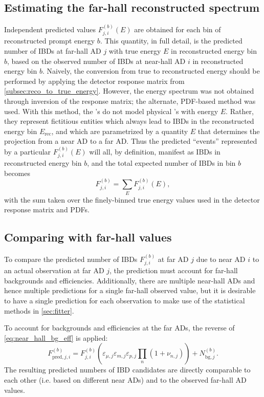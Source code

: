 \subsection{Estimating the far-hall reconstructed spectrum}
\label{subsec:true_to_reco_farhall}

Independent predicted values $F_{j,i}^{(b)}(E)$ are obtained
for each bin of reconstructed prompt energy $b$.
This quantity, in full detail,
is the predicted number of IBDs at far-hall AD $j$
with true \nuebar{} energy $E$ in reconstructed energy bin $b$,
based on the observed number of IBDs at near-hall AD $i$
in reconstructed energy bin $b$.
Naively, the conversion from true to reconstructed energy
should be performed by applying the detector response matrix
from \cref{subsec:reco_to_true_energy}.
However, the \nuebar{} energy spectrum was not obtained
through inversion of the response matrix;
the alternate, PDF-based method was used.
With this method, the \nuebar{}'s do not model physical \nuebar{}'s with energy $E$.
Rather, they represent fictitious entities which always
lead to IBDs in the reconstructed energy bin $E_\text{rec}$,
and which are parametrized by a quantity $E$ that determines
the projection from a near AD to a far AD.
Thus the predicted ``events'' represented by a particular
$F_{j,i}^{(b)}(E)$ will all, by definition,
manifest as IBDs in reconstructed energy bin $b$,
and the total expected number of IBDs in bin $b$ becomes
\begin{equation}
    F_{j,i}^{(b)} = \sum_E F_{j,i}^{(b)}(E),
\end{equation}
with the sum taken over the finely-binned true energy values
used in the detector response matrix and PDFs.

\subsection{Comparing with far-hall values}
\label{subsec:far_bg_eff}

To compare the predicted number of IBDs $F_{j,i}^{(b)}$
at far AD $j$ due to near AD $i$
to an actual observation at far AD $j$,
the prediction must account for far-hall backgrounds and efficiencies.
Additionally, there are multiple near-hall ADs
and hence multiple predictions for a single far-hall observed value,
but it is desirable to have a single prediction for each observation
to make use of the statistical methods in \cref{sec:fitter}.

To account for backgrounds and efficiencies at the far ADs,
the reverse of \cref{eq:near_hall_bg_eff} is applied:
\begin{equation}\label{eq:far_hall_bg_eff}
    F_{\text{pred},j,i}^{(b)} = F_{j,i}^{(b)}\left(
        \varepsilon_{\mu,j}\varepsilon_{m,j}\varepsilon_{p,j}
        \prod_n(1 + \nu_{n,j})
    \right)
    + N_{\text{bg},j}^{(b)}.
\end{equation}
The resulting predicted numbers of IBD candidates
are directly comparable to each other (i.e. based on different near ADs)
and to the observed far-hall AD values.

